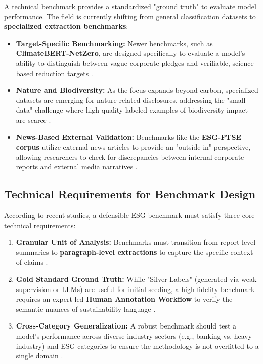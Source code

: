 A technical benchmark provides a standardized "ground truth" to evaluate model performance. The field is currently shifting from general classification datasets to \textbf{specialized extraction benchmarks}:
\begin{itemize}
\item 

\textbf{Target-Specific Benchmarking:} Newer benchmarks, such as \textbf{ClimateBERT-NetZero}, are designed specifically to evaluate a model's ability to distinguish between vague corporate pledges and verifiable, science-based reduction targets  \parencite{tobias_schimanski_241ada20}.\item 

\textbf{Nature and Biodiversity:} As the focus expands beyond carbon, specialized datasets are emerging for nature-related disclosures, addressing the "small data" challenge where high-quality labeled examples of biodiversity impact are scarce  \parencite{tobias_schimanski_3549ff9f}.\item 

\textbf{News-Based External Validation:} Benchmarks like the \textbf{ESG-FTSE corpus} utilize external news articles to provide an "outside-in" perspective, allowing researchers to check for discrepancies between internal corporate reports and external media narratives  \parencite[]{fabian_billert_a5fbb687, mariya_pavlova_259be499}.
\end{itemize}
\subsection{Technical Requirements for Benchmark Design}

According to recent studies, a defensible ESG benchmark must satisfy three core technical requirements:
\begin{enumerate}
\item 

\textbf{Granular Unit of Analysis:} Benchmarks must transition from report-level summaries to \textbf{paragraph-level extractions} to capture the specific context of claims  \parencite{jacob_beck_9548a833}.\item 

\textbf{Gold Standard Ground Truth:} While "Silver Labels" (generated via weak supervision or LLMs) are useful for initial seeding, a high-fidelity benchmark requires an expert-led \textbf{Human Annotation Workflow} to verify the semantic nuances of sustainability language  \parencite[]{keane_ong_369a0b63, chong_xu_bff21576}.\item 

\textbf{Cross-Category Generalization:} A robust benchmark should test a model's performance across diverse industry sectors (e.g., banking vs. heavy industry) and ESG categories to ensure the methodology is not overfitted to a single domain  \parencite[]{yinan_yu_e282fd98, keane_ong_369a0b63}.
\end{enumerate}

